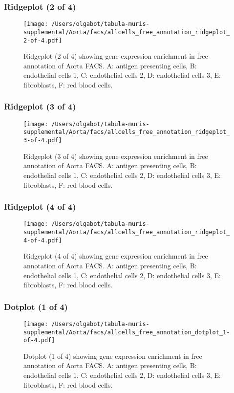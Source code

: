 \clearpage
\clearpage
\subsubsection{Ridgeplot (2 of 4)}
\begin{figure}[h]
\centering
\texttt{[image: /Users/olgabot/tabula-muris-supplemental/Aorta/facs/allcells\_free\_annotation\_ridgeplot\_2-of-4.pdf]}

\caption{ Ridgeplot (2 of 4)  showing gene expression enrichment in free annotation of Aorta FACS. A: antigen presenting cells, B: endothelial cells 1, C: endothelial cells 2, D: endothelial cells 3, E: fibroblasts, F: red blood cells.}
\end{figure}


\clearpage
\clearpage
\subsubsection{Ridgeplot (3 of 4)}
\begin{figure}[h]
\centering
\texttt{[image: /Users/olgabot/tabula-muris-supplemental/Aorta/facs/allcells\_free\_annotation\_ridgeplot\_3-of-4.pdf]}

\caption{ Ridgeplot (3 of 4)  showing gene expression enrichment in free annotation of Aorta FACS. A: antigen presenting cells, B: endothelial cells 1, C: endothelial cells 2, D: endothelial cells 3, E: fibroblasts, F: red blood cells.}
\end{figure}


\clearpage
\clearpage
\subsubsection{Ridgeplot (4 of 4)}
\begin{figure}[h]
\centering
\texttt{[image: /Users/olgabot/tabula-muris-supplemental/Aorta/facs/allcells\_free\_annotation\_ridgeplot\_4-of-4.pdf]}

\caption{ Ridgeplot (4 of 4)  showing gene expression enrichment in free annotation of Aorta FACS. A: antigen presenting cells, B: endothelial cells 1, C: endothelial cells 2, D: endothelial cells 3, E: fibroblasts, F: red blood cells.}
\end{figure}


\clearpage
\clearpage
\subsubsection{Dotplot (1 of 4)}
\begin{figure}[h]
\centering
\texttt{[image: /Users/olgabot/tabula-muris-supplemental/Aorta/facs/allcells\_free\_annotation\_dotplot\_1-of-4.pdf]}

\caption{ Dotplot (1 of 4)  showing gene expression enrichment in free annotation of Aorta FACS. A: antigen presenting cells, B: endothelial cells 1, C: endothelial cells 2, D: endothelial cells 3, E: fibroblasts, F: red blood cells.}
\end{figure}


